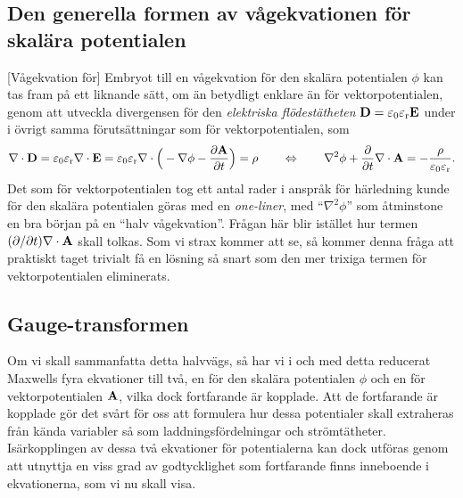 \subsection{Den generella formen av v{\aa}gekvationen f{\"o}r skal{\"a}ra
  potentialen}
[V{\aa}gekvation f{\"o}r]
Embryot till en v{\aa}gekvation f{\"o}r den skal{\"a}ra potentialen $\phi$ kan
tas fram p{\aa} ett liknande s{\"a}tt, om {\"a}n betydligt enklare {\"a}n
f{\"o}r vektorpotentialen, genom att utveckla divergensen f{\"o}r den
{\it elektriska fl{\"o}dest{\"a}theten} ${\bf D}=\varepsilon_0\varepsilon_{\rm r}
{\bf E}$ under i {\"o}vrigt samma f{\"o}ruts{\"a}ttningar som f{\"o}r
vektorpotentialen, som
$$
  \nabla\cdot{\bf D}
    =\varepsilon_0\varepsilon_{\rm r}\nabla\cdot{\bf E}
    =\varepsilon_0\varepsilon_{\rm r}\nabla\cdot
        \Big(-\nabla\phi-{{\partial{\bf A}}\over{\partial t}}\Big)
    =\rho
  \qquad\Leftrightarrow\qquad
    \nabla^2\phi+{{\partial}\over{\partial t}}\nabla\cdot{\bf A}
    =-{{\rho}\over{\varepsilon_0\varepsilon_{\rm r}}}.
$$
Det som f{\"o}r vektorpotentialen tog ett antal rader i anspr{\aa}k f{\"o}r
h{\"a}rledning kunde f{\"o}r den skal{\"a}ra potentialen g{\"o}ras med en
{\it one-liner}, med ``$\nabla^2\phi$'' som {\aa}tminstone en bra b{\"o}rjan
p{\aa} en ``halv v{\aa}gekvation''.
Fr{\aa}gan h{\"a}r blir ist{\"a}llet hur termen $({{\partial}/{\partial t}})
\nabla\cdot{\bf A}$ skall tolkas.
Som vi strax kommer att se, s{\aa} kommer denna fr{\aa}ga att praktiskt taget
trivialt f{\aa} en l{\"o}sning s{\aa} snart som den mer trixiga termen f{\"o}r
vektorpotentialen eliminerats.

\subsection{Gauge-transformen}
Om vi skall sammanfatta detta halvv{\"a}gs, s{\aa} har vi i och med detta
reducerat Maxwells fyra ekvationer till tv{\aa}, en f{\"o}r den skal{\"a}ra
potentialen $\phi$ och en f{\"o}r vektorpotentialen ${\bf A}$, vilka dock
fortfarande {\"a}r kopplade. Att de fortfarande {\"a}r kopplade g{\"o}r det
sv{\aa}rt f{\"o}r oss att formulera hur dessa potentialer skall extraheras
fr{\aa}n k{\"a}nda variabler s{\aa} som laddningsf{\"o}rdelningar och
str{\"o}mt{\"a}theter.
Is{\"a}rkopplingen av dessa tv{\aa} ekvationer f{\"o}r potentialerna kan dock
utf{\"o}ras genom att utnyttja en viss grad av godtycklighet som fortfarande
finns inneboende i ekvationerna, som vi nu skall visa.

